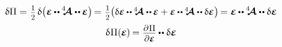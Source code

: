 \vspace{-0.4em}\noindent
{}

\nopagebreak\vspace{.3em}\begin{equation*}
\begin{gathered}
\variation{\potentialenergydensity}
= \hspace{.1ex}
\smash{\smalldisplaystyleonehalf} \hspace{.25ex}
\variation{ \bigl(
   \infinitesimaldeformation
   \hspace{-0.1ex} \dotdotp \hspace{-0.1ex}
   \stiffnesstensor
   \dotdotp \hspace{-0.1ex}
   \infinitesimaldeformation
\bigr)
} \hspace{-0.25ex}
= \hspace{.1ex}
\smash{\smalldisplaystyleonehalf}
\hspace{-0.1ex} \bigl(
\scalebox{.95}{$
   \variation{\infinitesimaldeformation}
   \hspace{-0.1ex} \dotdotp \hspace{-0.1ex}
   \stiffnesstensor
   \dotdotp \hspace{-0.1ex}
   \infinitesimaldeformation
   +
   \infinitesimaldeformation
   \hspace{-0.1ex} \dotdotp \hspace{-0.1ex}
   \stiffnesstensor
   \dotdotp
   \variation{\infinitesimaldeformation}
$}
\bigr)
\hspace{-0.25ex} =
\tikzmark{beginLinearStressAsDeformationAndStiffness}
\infinitesimaldeformation
\hspace{-0.1ex} \dotdotp \hspace{-0.1ex}
\stiffnesstensor
\tikzmark{endLinearStressAsDeformationAndStiffness}
\dotdotp
\variation{\infinitesimaldeformation}
\\[.3em]
%
\variation{\hspace{.1ex}\potentialenergydensity}
( \hspace{-0.1ex}
    \infinitesimaldeformation
\hspace{-0.1ex} ) \hspace{-0.2ex}
= \scalebox{.9}{$
    \displaystyle\frac{
        \raisemath{-0.16em}
        {\partial \hspace{.1ex} \potentialenergydensity}}
        {\partial \infinitesimaldeformation}
    $} \hspace{-0.1ex}
\dotdotp
\variation{\infinitesimaldeformation}

\end{gathered}
\end{equation*}

